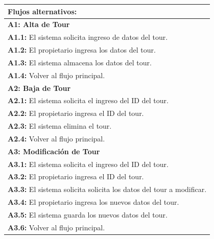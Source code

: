 \documentclass[12pt,a4paper,titlepage,oneside]{article}
\begin{document}
\begin{tabular}{| l | p{0.8\linewidth} |}
	\multicolumn{2}{|p{0.8\linewidth}|}{\textbf{Flujos alternativos:}	}\\ 			     \hline
	\multicolumn{2}{|p{0.8\linewidth}|}{\textbf{A1: Alta de Tour}} \\ \hline
	\multicolumn{2}{|p{0.8\linewidth}|}{\textbf{A1.1:} El sistema solicita ingreso de datos del tour.} \\ \hline
	\multicolumn{2}{|p{0.8\linewidth}|}{\textbf{A1.2:} El propietario ingresa los datos del tour.
	} \\ \hline
	\multicolumn{2}{|p{0.8\linewidth}|}{\textbf{A1.3:} El sistema almacena los datos del tour.
	} \\ \hline
	\multicolumn{2}{|p{0.8\linewidth}|}{\textbf{A1.4:} Volver al flujo principal.
	} \\ \hline
		\multicolumn{2}{|p{0.8\linewidth}|}{\textbf{A2: Baja de Tour}} \\ \hline
	\multicolumn{2}{|p{0.8\linewidth}|}{\textbf{A2.1:} El sistema solicita el ingreso del ID del tour.} \\ \hline
	\multicolumn{2}{|p{0.8\linewidth}|}{\textbf{A2.2:} El propietario ingresa el ID del tour. 
	} \\ \hline
	\multicolumn{2}{|p{0.8\linewidth}|}{\textbf{A2.3:} El sistema elimina el tour.
	} \\ \hline
	\multicolumn{2}{|p{0.8\linewidth}|}{\textbf{A2.4:} Volver al flujo principal.
	} \\ \hline
		\multicolumn{2}{|p{0.8\linewidth}|}{\textbf{A3: Modificación de Tour}} \\ \hline
	\multicolumn{2}{|p{0.8\linewidth}|}{\textbf{A3.1:} El sistema solicita el ingreso del ID del tour.} \\ \hline
	\multicolumn{2}{|p{0.8\linewidth}|}{\textbf{A3.2:} El propietario ingresa el ID del tour. 
	} \\ \hline
	\multicolumn{2}{|p{0.8\linewidth}|}{\textbf{A3.3:} El sistema solicita solicita los datos del tour a modificar.
	} \\ \hline
	\multicolumn{2}{|p{0.8\linewidth}|}{\textbf{A3.4:} El propietario ingresa los nuevos datos del tour.
	} \\ \hline
		\multicolumn{2}{|p{0.8\linewidth}|}{\textbf{A3.5:} El sistema guarda los nuevos datos del tour.
	} \\ \hline
	\multicolumn{2}{|p{0.8\linewidth}|}{\textbf{A3.6:} Volver al flujo principal.
	} \\ \hline


\end{tabular} \\\\
\\\\\\\\
\end{document}
